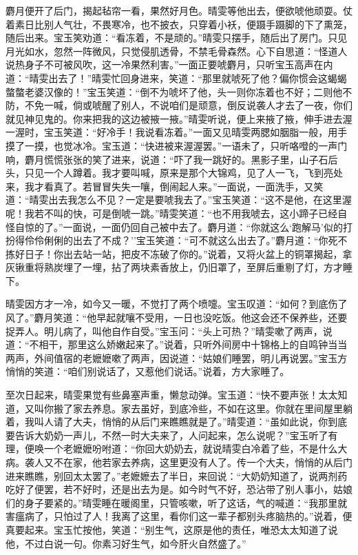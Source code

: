 麝月便开了后门，揭起毡帘一看，果然好月色。晴雯等他出去，便欲唬他顽耍。仗着素日比别人气壮，不畏寒冷，也不披衣，只穿着小袄，便蹑手蹑脚的下了熏笼，随后出来。宝玉笑劝道：``看冻着，不是顽的。''晴雯只摆手，随后出了房门。只见月光如水，忽然一阵微风，只觉侵肌透骨，不禁毛骨森然。心下自思道：``怪道人说热身子不可被风吹，这一冷果然利害。''一面正要唬麝月，只听宝玉高声在内道：``晴雯出去了！''晴雯忙回身进来，笑道：``那里就唬死了他？偏你惯会这蝎蝎螫螫老婆汉像的！''宝玉笑道：``倒不为唬坏了他，头一则你冻着也不好；二则他不防，不免一喊，倘或唬醒了别人，不说咱们是顽意，倒反说袭人才去了一夜，你们就见神见鬼的。你来把我的这边被掖一掖。''晴雯听说，便上来掖了掖，伸手进去渥一渥时，宝玉笑道：``好冷手！我说看冻着。''一面又见晴雯两腮如胭脂一般，用手摸了一摸，也觉冰冷。宝玉道：``快进被来渥渥罢。''一语未了，只听咯噔的一声门响，麝月慌慌张张的笑了进来，说道：``吓了我一跳好的。黑影子里，山子石后头，只见一个人蹲着。我才要叫喊，原来是那个大锦鸡，见了人一飞，飞到亮处来，我才看真了。若冒冒失失一嚷，倒闹起人来。''一面说，一面洗手，又笑道：``晴雯出去我怎么不见？一定是要唬我去了。''宝玉笑道：``这不是他，在这里渥呢！我若不叫的快，可是倒唬一跳。''晴雯笑道：``也不用我唬去，这小蹄子已经自怪自惊的了。''一面说，一面仍回自己被中去了。麝月道：``你就这么`跑解马'似的打扮得伶伶俐俐的出去了不成？''宝玉笑道：``可不就这么出去了。''麝月道：``你死不拣好日子！你出去站一站，把皮不冻破了你的。''说着，又将火盆上的铜罩揭起，拿灰锹重将熟炭埋了一埋，拈了两块素香放上，仍旧罩了，至屏后重剔了灯，方才睡下。

晴雯因方才一冷，如今又一暖，不觉打了两个喷嚏。宝玉叹道：``如何？到底伤了风了。''麝月笑道：``他早起就嚷不受用，一日也没吃饭。他这会还不保养些，还要捉弄人。明儿病了，叫他自作自受。''宝玉问：``头上可热？''晴雯嗽了两声，说道：``不相干，那里这么娇嫩起来了。''说着，只听外间房中十锦格上的自鸣钟当当两声，外间值宿的老嬷嬷嗽了两声，因说道：``姑娘们睡罢，明儿再说罢。''宝玉方悄悄的笑道：``咱们别说话了，又惹他们说话。''说着，方大家睡了。

至次日起来，晴雯果觉有些鼻塞声重，懒怠动弹。宝玉道：``快不要声张！太太知道，又叫你搬了家去养息。家去虽好，到底冷些，不如在这里。你就在里间屋里躺着，我叫人请了大夫，悄悄的从后门来瞧瞧就是了。''晴雯道：``虽如此说，你到底要告诉大奶奶一声儿，不然一时大夫来了，人问起来，怎么说呢？''宝玉听了有理，便唤一个老嬷嬷吩咐道：``你回大奶奶去，就说晴雯白冷着了些，不是什么大病。袭人又不在家，他若家去养病，这里更没有人了。传一个大夫，悄悄的从后门进来瞧瞧，别回太太罢了。''老嬷嬷去了半日，来回说：``大奶奶知道了，说两剂药吃好了便罢，若不好时，还是出去为是。如今时气不好，恐沾带了别人事小，姑娘们的身子要紧的。''晴雯睡在暖阁里，只管咳嗽，听了这话，气的喊道：``我那里就害瘟病了，只怕过了人！我离了这里，看你们这一辈子都别头疼脑热的。''说着，便真要起来。宝玉忙按他，笑道：``别生气，这原是他的责任，唯恐太太知道了说他，不过白说一句。你素习好生气，如今肝火自然盛了。''

